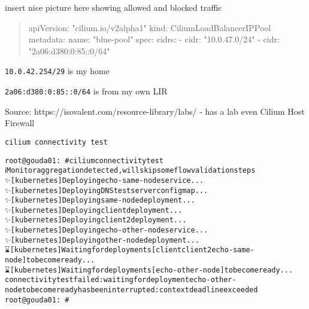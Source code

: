 \documentclass[Screen16to9,17pt]{foils}
\begin{document}
\begin{list2}
    \item {}
\end{list2}



insert nice picture here showing allowed and blocked traffic






\begin{quote}
apiVersion: "cilium.io/v2alpha1"
kind: CiliumLoadBalancerIPPool
metadata:
  name: "blue-pool"
spec:
  cidrs:
  - cidr: "10.0.47.0/24"
  - cidr: "2a06:d380:0:85::0/64"
\end{quote}

\begin{list2}
\item {}
\item \verb+10.0.42.254/29+ is my home
\item \verb+2a06:d380:0:85::0/64+ is from my own LIR
\end{list2}

Source:
https://isovalent.com/resource-library/labs/ - has a lab even Cilium Host Firewall





\verb+cilium connectivity test+



\begin{alltt}
root@gouda01:~# cilium connectivity test
ℹ️  Monitor aggregation detected, will skip some flow validation steps
✨ [kubernetes] Deploying echo-same-node service...
✨ [kubernetes] Deploying DNS test server configmap...
✨ [kubernetes] Deploying same-node deployment...
✨ [kubernetes] Deploying client deployment...
✨ [kubernetes] Deploying client2 deployment...
✨ [kubernetes] Deploying echo-other-node service...
✨ [kubernetes] Deploying other-node deployment...
⌛ [kubernetes] Waiting for deployments [client client2 echo-same-node] to become ready...
⌛ [kubernetes] Waiting for deployments [echo-other-node] to become ready...
connectivity test failed: waiting for deployment echo-other-node to become ready has been interrupted: context deadline exceeded
root@gouda01:~#
\end{alltt}
\end{document}
